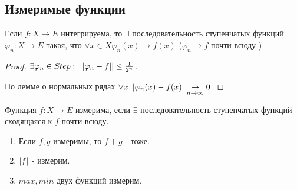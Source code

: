 \subsection{Измеримые функции}

\begin{theorem*}
    Если $f: X \to E$ интегрируема, то $\exists$ последовательность ступенчатых функций $\varphi_n: X \to E$ такая, что $\vee x \in X \varphi_n(x) \to f(x)$ ($\varphi_n \to f$ почти всюду )
    \begin{proof}
        $\exists \varphi_n \in Step: \ \left| \left|  \varphi_n - f \right| \right| \le \frac{1}{2^n}$. \par
        По лемме о нормальных рядах $\vee x \ \abs{\varphi_n(x) - f(x)} \underset{n \to \infty}{\to} 0$. 
    \end{proof}
\end{theorem*}

\begin{definition*}
    Функция $f: X \to E$ измерима, если $\exists$ последовательность ступенчатых функций сходящаяся к $f$ почти всюду.
\end{definition*}

\begin{statement*}
    \begin{enumerate}
        \item Если $f, g$ измеримы, то $f+g$ - тоже.
        \item $\left| f \right|$ - измерим.
        \item $max, min$ двух функций измерим.
    \end{enumerate}
\end{statement*}

